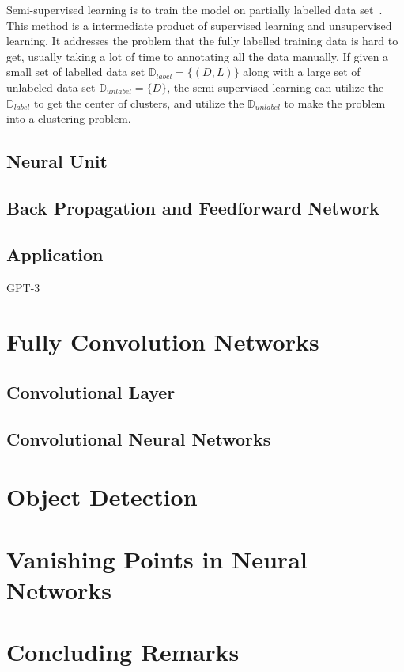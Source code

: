 \begin{spacing}{1.5}
Semi-supervised learning is to train the model on partially labelled data set~\cite{zhu2009introduction, zhu2005semi}. This method is a intermediate product of supervised learning and unsupervised learning. It addresses the problem that the fully labelled training data is hard to get, usually taking a lot of time to annotating all the data manually. If given a small set of labelled data set $\mathbb{D}_{label} = \{(D,L)\}$ along with a large set of unlabeled data set $\mathbb{D}_{unlabel} = \{D\}$, the semi-supervised learning can utilize the $\mathbb{D}_{label}$ to get the center of clusters, and utilize the $\mathbb{D}_{unlabel}$ to make the problem into a clustering problem.

\subsection{Neural Unit}
\label{subsec:neural_unit}

\subsection{Back Propagation and Feedforward Network}
\label{subsec:back_propagation}

\subsection{Application}

GPT-3~\cite{brown2020language}

\section{Fully Convolution Networks}
\label{sec:LR_FCN}

\subsection{Convolutional Layer}

\subsection{Convolutional Neural Networks}

\section{Object Detection}
\label{sec:LR_objectdetection}



\section{Vanishing Points in Neural Networks}
\label{sec:LR_vpinNN}

\section{Concluding Remarks}

\end{spacing}
\newpage

